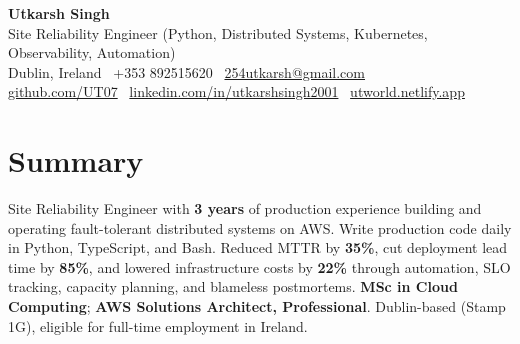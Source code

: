 \documentclass[10pt,a4paper]{article}
\begin{document}
\begin{center}
{\Large \textbf{Utkarsh Singh}}\\[0.04em]
{\normalsize Site Reliability Engineer (Python, Distributed Systems, Kubernetes, Observability, Automation)}\\[0.08em]
Dublin, Ireland \textbar\ +353 892515620 \textbar\ \href{mailto:254utkarsh@gmail.com}{254utkarsh@gmail.com}\\[0.08em]
\href{https://github.com/UT07}{github.com/UT07} \textbar\
\href{https://www.linkedin.com/in/utkarshsingh2001/}{linkedin.com/in/utkarshsingh2001} \textbar\
\href{https://utworld.netlify.app}{utworld.netlify.app}
\end{center}
\vspace{0.06em}

\section*{Summary}
Site Reliability Engineer with \textbf{3 years} of production experience building and operating fault-tolerant distributed systems on AWS. Write production code daily in Python, TypeScript, and Bash. Reduced MTTR by \textbf{35\%}, cut deployment lead time by \textbf{85\%}, and lowered infrastructure costs by \textbf{22\%} through automation, SLO tracking, capacity planning, and blameless postmortems. \textbf{MSc in Cloud Computing}; \textbf{AWS Solutions Architect, Professional}. Dublin-based (Stamp 1G), eligible for full-time employment in Ireland.

\end{document}
